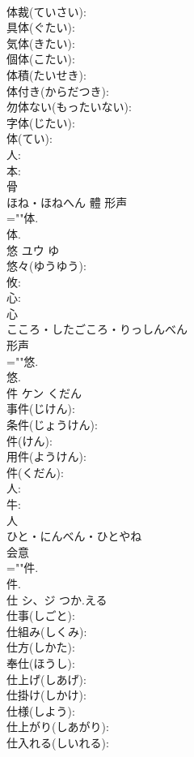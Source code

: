 \documentclass[8pt]{extreport}
\begin{document}
\begin{CJK}{UTF8}{min}
\\	体裁(ていさい): 
\\	具体(ぐたい): 
\\	気体(きたい): 
\\	個体(こたい): 
\\	体積(たいせき): 
\\	体付き(からだつき): 
\\	勿体ない(もったいない): 
\\	字体(じたい): 
\\	体(てい): 
\\	人: 
\\	本: 
\\	骨	
\\	ほね・ほねへん	體	形声 
\\	=""体.
\\	体.
\\	悠	ユウ		ゆ	
\\	悠々(ゆうゆう): 
\\	攸: 
\\	心: 
\\	心	
\\	こころ・したごころ・りっしんべん	
\\	形声 
\\	=""悠.
\\	悠.
\\	件	ケン	くだん		
\\	事件(じけん): 
\\	条件(じょうけん): 
\\	件(けん): 
\\	用件(ようけん): 
\\	件(くだん): 
\\	人: 
\\	牛: 
\\	人	
\\	ひと・にんべん・ひとやね	
\\	会意 
\\	=""件.
\\	件.
\\	仕	シ、ジ	つか.える		
\\	仕事(しごと): 
\\	仕組み(しくみ): 
\\	仕方(しかた): 
\\	奉仕(ほうし): 
\\	仕上げ(しあげ): 
\\	仕掛け(しかけ): 
\\	仕様(しよう): 
\\	仕上がり(しあがり): 
\\	仕入れる(しいれる): 

\end{CJK}
\end{document}
